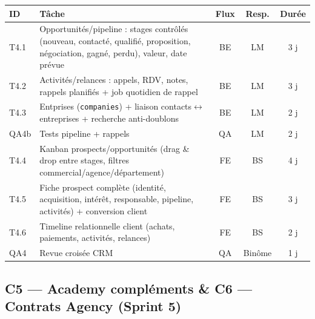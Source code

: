 \documentclass[11pt,a4paper]{article}
\begin{document}
\begin{tabularx}{\textwidth}{|l|Y|c|c|c|}
\hline
{}\textbf{ID} & \textbf{Tâche} & \textbf{Flux} & \textbf{Resp.} & \textbf{Durée} \\ \hline
T4.1 & Opportunités/pipeline : stages contrôlés (nouveau, contacté, qualifié, proposition, négociation, gagné, perdu), valeur, date prévue & BE & LM & 3 j \\ \hline
T4.2 & Activités/relances : appels, RDV, notes, rappels planifiés + job quotidien de rappel & BE & LM & 3 j \\ \hline
T4.3 & Entprises (\texttt{companies}) + liaison contacts$\leftrightarrow$entreprises + recherche anti-doublons & BE & LM & 2 j \\ \hline
QA4b & Tests pipeline + rappels & QA & LM & 2 j \\ \hline
T4.4 & Kanban prospects/opportunités (drag \& drop entre stages, filtres commercial/agence/département) & FE & BS & 4 j \\ \hline
T4.5 & Fiche prospect complète (identité, acquisition, intérêt, responsable, pipeline, activités) + conversion client & FE & BS & 3 j \\ \hline
T4.6 & Timeline relationnelle client (achats, paiements, activités, relances) & FE & BS & 2 j \\ \hline
QA4 & Revue croisée CRM & QA & Binôme & 1 j \\ \hline
\end{tabularx}

\subsection{C5 --- Academy compléments \& C6 --- Contrats Agency (Sprint 5)}
\end{document}
